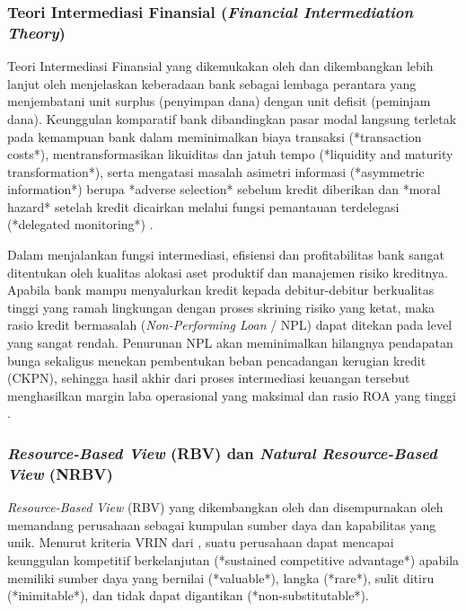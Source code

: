 \documentclass[12pt,a4paper]{article}
\numberwithin{equation}{section}
\begin{document}
\subsubsection{Teori Intermediasi Finansial (\emph{Financial Intermediation Theory})}
\noindent
Teori Intermediasi Finansial yang dikemukakan oleh \citet{GurleyShaw1960} dan dikembangkan lebih lanjut oleh \citet{Diamond1984} menjelaskan keberadaan bank sebagai lembaga perantara yang menjembatani unit surplus (penyimpan dana) dengan unit defisit (peminjam dana). Keunggulan komparatif bank dibandingkan pasar modal langsung terletak pada kemampuan bank dalam meminimalkan biaya transaksi (*transaction costs*), mentransformasikan likuiditas dan jatuh tempo (*liquidity and maturity transformation*), serta mengatasi masalah asimetri informasi (*asymmetric information*) berupa *adverse selection* sebelum kredit diberikan dan *moral hazard* setelah kredit dicairkan melalui fungsi pemantauan terdelegasi (*delegated monitoring*) \citep{Diamond1984, KuncoroSuhardjono2018}.

\noindent
Dalam menjalankan fungsi intermediasi, efisiensi dan profitabilitas bank sangat ditentukan oleh kualitas alokasi aset produktif dan manajemen risiko kreditnya. Apabila bank mampu menyalurkan kredit kepada debitur-debitur berkualitas tinggi yang ramah lingkungan dengan proses skrining risiko yang ketat, maka rasio kredit bermasalah (\emph{Non-Performing Loan} / NPL) dapat ditekan pada level yang sangat rendah. Penurunan NPL akan meminimalkan hilangnya pendapatan bunga sekaligus menekan pembentukan beban pencadangan kerugian kredit (CKPN), sehingga hasil akhir dari proses intermediasi keuangan tersebut menghasilkan margin laba operasional yang maksimal dan rasio ROA yang tinggi \citep{Fachrudin2021, Dendawijaya2015}.

\subsubsection{\emph{Resource-Based View} (RBV) dan \emph{Natural Resource-Based View} (NRBV)}
\noindent
\emph{Resource-Based View} (RBV) yang dikembangkan oleh \citet{Wernerfelt1984} dan disempurnakan oleh \citet{Barney1991} memandang perusahaan sebagai kumpulan sumber daya dan kapabilitas yang unik. Menurut kriteria VRIN dari \citet{Barney1991}, suatu perusahaan dapat mencapai keunggulan kompetitif berkelanjutan (*sustained competitive advantage*) apabila memiliki sumber daya yang bernilai (*valuable*), langka (*rare*), sulit ditiru (*inimitable*), dan tidak dapat digantikan (*non-substitutable*).
\end{document}

